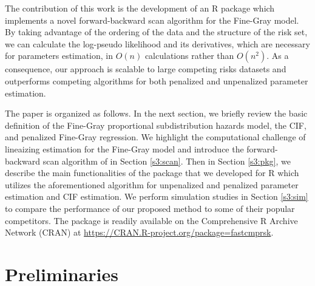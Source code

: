 The contribution of this work is the development of an {R} package  which implements a novel forward-backward scan algorithm \citep{kawaguchi2019scalable} for the Fine-Gray model. By taking advantage of the ordering of the data and the structure of the risk set, we can calculate the log-pseudo likelihood and its derivatives, which are necessary for parameters estimation, in $O(n)$ calculations rather than $O(n^2)$. As a consequence, our approach is scalable to large competing risks datasets and outperforms competing algorithms for both penalized and unpenalized parameter estimation. 

The paper is organized as follows. In the next section, we briefly review the basic definition of the Fine-Gray proportional subdistribution hazards model, the CIF, and penalized Fine-Gray regression. We highlight the computational challenge of lineaizing estimation for the Fine-Gray model and introduce the forward-backward scan algorithm of \cite{kawaguchi2019scalable} in Section \ref{s3:scan}. Then in Section \ref{s3:pkg}, we describe the main functionalities of the  package that we developed for {R} which utilizes the aforementioned algorithm for unpenalized and penalized parameter estimation and CIF estimation. We perform simulation studies in Section \ref{s3:sim} to compare the performance of our proposed method to some of their popular competitors. The  package is readily available on the Comprehensive R Archive Network (CRAN) at  \url{https://CRAN.R-project.org/package=fastcmprsk}.


\section{Preliminaries}
